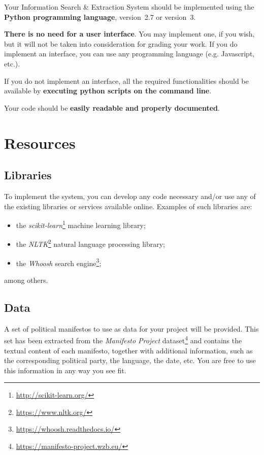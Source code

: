 \documentclass[12pt]{article}
\begin{document}
Your Information Search \& Extraction System should be implemented using the
\textbf{Python programming language}, version~2.7 or version~3.

\textbf{There is no need for a user interface}. You may implement one, if you
wish, but it will not be taken into consideration for grading your work. If
you do implement an interface, you can use any programming language
(e.g. Javascript, etc.).

If you do not implement an interface, all the required functionalities should
be available by \textbf{executing python scripts on the command line}.

Your code should be \textbf{easily readable and properly documented}.

\section{Resources}
\label{sec:resources}

\subsection*{Libraries}
\label{libraries}

To implement the system, you can develop any code necessary and/or use any of
the existing libraries or services available online. Examples of such libraries
are:
\begin{itemize}
\item the \emph{scikit-learn}\footnote{\url{http://scikit-learn.org/}} machine
    learning library;
\item the \emph{NLTK}\footnote{\url{https://www.nltk.org/}} natural language
    processing library;
\item the \emph{Whoosh} search
    engine\footnote{\url{https://whoosh.readthedocs.io/}};
\end{itemize} among others.

\subsection*{Data}
\label{sec:data}

A set of political manifestos to use as data for your project will be
provided. This set has been extracted from the \emph{Manifesto Project}
dataset\footnote{\url{https://manifesto-project.wzb.eu/}} and contains the
textual content of each manifesto, together with additional information, such
as the corresponding political party, the language, the date, etc. You are
free to use this information in any way you see fit.
\end{document}
